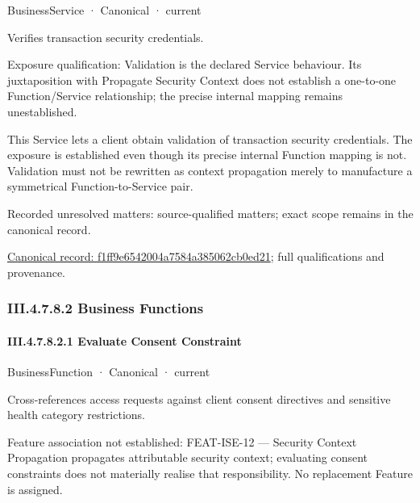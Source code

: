 \label{element:f1ff9e6542004a7584a385062cb0ed21}
{\small BusinessService · Canonical · current}\par

Verifies transaction security credentials.



Exposure qualification: Validation is the declared Service behaviour. Its juxtaposition with Propagate Security Context does not establish a one-to-one Function/Service relationship; the precise internal mapping remains unestablished.



This Service lets a client obtain validation of transaction security credentials. The exposure is established even though its precise internal Function mapping is not. Validation must not be rewritten as context propagation merely to manufacture a symmetrical Function-to-Service pair.


{\small Recorded unresolved matters: source-qualified matters; exact scope remains in the canonical record.}\par
{\footnotesize \href{../../../../continuum/business/business-service/f1ff9e6542004a7584a385062cb0ed21.md}{Canonical record: f1ff9e6542004a7584a385062cb0ed21}; full qualifications and provenance.}\par
\subsubsection*{III.4.7.8.2 Business Functions}
\label{navigation:III.4.7.8.2}

\paragraph*{III.4.7.8.2.1 Evaluate Consent Constraint}
\label{navigation:III.4.7.8.2.1}

\label{element:4a881488296d43d09112cb046fa836d3}
{\small BusinessFunction · Canonical · current}\par

Cross-references access requests against client consent directives and sensitive health category restrictions.



Feature association not established: FEAT-ISE-12 — Security Context Propagation propagates attributable security context; evaluating consent constraints does not materially realise that responsibility. No replacement Feature is assigned.


